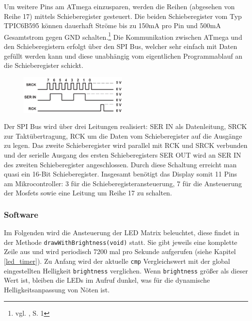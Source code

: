 Um weitere Pins am ATmega einzusparen, werden die Reihen (abgesehen von Reihe 17)
mittels Schieberegister gesteuert. Die beiden Schieberegister vom Typ
TPIC6B595 können dauerhaft Ströme bis zu 150mA pro Pin und 500mA Gesamtstrom gegen GND
schalten.\footnote{vgl. \cite{6b595}, S. 1} Die Kommunikation zwischen ATmega
und den Schieberegistern erfolgt über den SPI Bus, welcher sehr einfach mit Daten gefüllt werden kann und
diese unabhängig vom eigentlichen Programmablauf an die Schieberegister schickt.

\begin{figure}
  \vspace{-25pt}
  \begin{center}
    \includegraphics[width=0.48\textwidth]{skizzen/schieberegister_linien.png}
  \end{center}
  \vspace{-20pt}
\end{figure}

Der SPI Bus wird über drei Leitungen realisiert: SER IN als Datenleitung,
SRCK zur Taktübertragung, RCK um die Daten vom Schieberegister auf die
Ausgänge zu legen. Das zweite Schieberegister wird parallel mit RCK und SRCK verbunden und der serielle Ausgang des ersten Schieberegisters SER OUT wird an
SER IN des zweiten Schieberegister angeschlossen. Durch diese Schaltung erreicht man
quasi ein 16-Bit Schieberegister.
Insgesamt benötigt das Display somit 11 Pins am Mikrocontroller: 3 für die
Schieberegisteransteuerung, 7 für die Ansteuerung der Mosfets sowie eine Leitung
um Reihe 17 zu schalten.
\subsubsection{Software}
Im Folgenden wird die Ansteuerung der LED Matrix beleuchtet, diese findet in der
Methode \texttt{drawWithBrightness(void)} statt. Sie gibt jeweils eine komplette
Zeile aus und wird periodisch 7200 mal pro Sekunde aufgerufen (siehe
Kapitel \ref{led_timer}).
Zu Anfang wird der aktuelle \texttt{cmp} Vergleichswert mit der global eingestellten Helligkeit \texttt{brightness} verglichen. Wenn \texttt{brightness} größer als dieser Wert ist, bleiben die LEDs
im Aufruf dunkel, was für die dynamische Helligkeitsanpassung von Nöten ist. 

